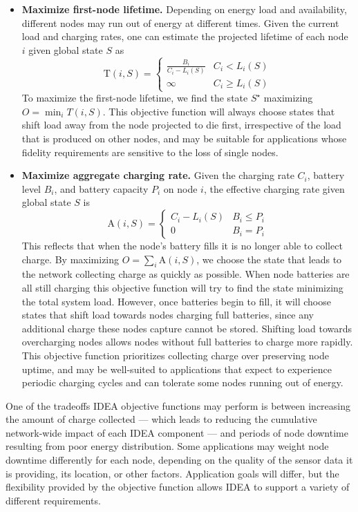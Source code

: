 \begin{itemize}

\item \textbf{Maximize first-node lifetime.} Depending on energy load and
availability, different nodes may run out of energy at different times. Given
the current load and charging rates, one can estimate the projected lifetime
of each node $i$ given global state $S$ as \[ \mathrm{T}(i,S) = \left\{
\begin{array}{lr} \frac{B_i}{C_i - L_i(S)} & C_i < L_i(S) \\ \infty & C_i \ge
L_i(S) \end{array} \right. \] To maximize the first-node lifetime, we find
the state $S^\star$ maximizing $O = \min_{i} T(i,S)$. This objective function
will always choose states that shift load away from the node projected to die
first, irrespective of the load that is produced on other nodes, and may be
suitable for applications whose fidelity requirements are sensitive to the
loss of single nodes.

\item \textbf{Maximize aggregate charging rate.} Given the charging rate
$C_i$, battery level $B_i$, and battery capacity $P_i$ on node $i$, the
effective charging rate given global state $S$ is \[\mathrm{A}(i,S) = \left\{
\begin{array}{lr} C_i - L_i(S) & B_i \le P_i \\ 0 & B_i = P_i \end{array}
\right. \] This reflects that when the node's battery fills it is no longer
able to collect charge. By maximizing $O = \sum_{i} \mathrm{A}(i,S)$, we
choose the state that leads to the network collecting charge as quickly as
possible. When node batteries are all still charging this objective function
will try to find the state minimizing the total system load. However, once
batteries begin to fill, it will choose states that shift load towards nodes
charging full batteries, since any additional charge these nodes capture
cannot be stored. Shifting load towards overcharging nodes allows nodes
without full batteries to charge more rapidly. This objective function
prioritizes collecting charge over preserving node uptime, and may be
well-suited to applications that expect to experience periodic charging
cycles and can tolerate some nodes running out of energy.

\end{itemize}

One of the tradeoffs IDEA objective functions may perform is between
increasing the amount of charge collected --- which leads to reducing the
cumulative network-wide impact of each IDEA component --- and periods of node
downtime resulting from poor energy distribution. Some applications may
weight node downtime differently for each node, depending on the quality of
the sensor data it is providing, its location, or other factors. Application
goals will differ, but the flexibility provided by the objective function
allows IDEA to support a variety of different requirements.

